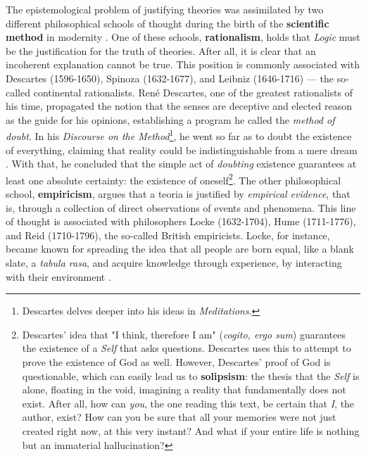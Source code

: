 \documentclass[./main_en.tex]{subfiles}
\begin{document}
\par The epistemological problem of justifying theories was assimilated by two different philosophical schools of thought during the birth of the \textbf{scientific method} in modernity \cite{sep-rationalism-empiricism}. One of these schools, \textbf{\gls{rationalism}}, holds that \textit{Logic} must be the justification for the truth of theories. After all, it is clear that an incoherent explanation cannot be true. This position is commonly associated with Descartes (1596-1650), Spinoza (1632-1677), and Leibniz (1646-1716) — the so-called continental rationalists. René Descartes, one of the greatest rationalists of his time, propagated the notion that the senses are deceptive and elected reason as the guide for his opinions, establishing a program he called the \textit{method of doubt}. In his \textit{Discourse on the Method}\footnote{Descartes delves deeper into his ideas in \textit{Meditations}.}, he went so far as to doubt the existence of everything, claiming that reality could be indistinguishable from a mere dream \cite{descartes2008discurso}. With that, he concluded that the simple act of \textit{doubting} existence guarantees at least one absolute certainty: the existence of oneself\footnote{Descartes' idea that "I think, therefore I am" (\textit{cogito, ergo sum}) guarantees the existence of a \textit{Self} that asks questions. Descartes uses this to attempt to prove the existence of God as well. However, Descartes' proof of God is questionable, which can easily lead us to \textbf{solipsism}: the thesis that the \textit{Self} is alone, floating in the void, imagining a reality that fundamentally does not exist. After all, how can \textit{you}, the one reading this text, be certain that \textit{I}, the author, exist? How can you be sure that all your memories were not just created right now, at this very instant? And what if your entire life is nothing but an immaterial hallucination?}. The other philosophical school, \textbf{\gls{empiricism}}, argues that a \gls{teoria} is justified by \textit{empirical evidence}, that is, through a collection of direct observations of events and phenomena. This line of thought is associated with philosophers Locke (1632-1704), Hume (1711-1776), and Reid (1710-1796), the so-called British empiricists. Locke, for instance, became known for spreading the idea that all people are born equal, like a blank slate, a \textit{tabula rasa}, and acquire knowledge through experience, by interacting with their environment \cite{sep-locke}.
\end{document}
